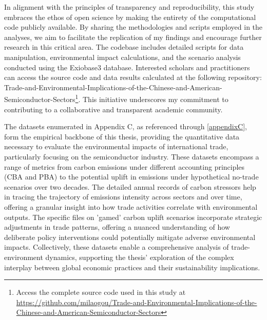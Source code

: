 In alignment with the principles of transparency and reproducibility, this study embraces the ethos of open science by making the entirety of the computational code publicly available. By sharing the methodologies and scripts employed in the analyses, we aim to facilitate the replication of my findings and encourage further research in this critical area. The codebase includes detailed scripts for data manipulation, environmental impact calculations, and the scenario analysis conducted using the Exiobase3 database. Interested scholars and practitioners can access the source code and data results calculated at the following repository: Trade-and-Environmental-Implications-of-the-Chinese-and-American-Semiconductor-Sectors\footnote{Access the complete source code used in this study at \url{https://github.com/milaogou/Trade-and-Environmental-Implications-of-the-Chinese-and-American-Semiconductor-Sectors}}. This initiative underscores my commitment to contributing to a collaborative and transparent academic community.

The datasets enumerated in Appendix C, as referenced through \ref{appendixC}, form the empirical backbone of this thesis, providing the quantitative data necessary to evaluate the environmental impacts of international trade, particularly focusing on the semiconductor industry. These datasets encompass a range of metrics from carbon emissions under different accounting principles (CBA and PBA) to the potential uplift in emissions under hypothetical no-trade scenarios over two decades. The detailed annual records of carbon stressors help in tracing the trajectory of emissions intensity across sectors and over time, offering a granular insight into how trade activities correlate with environmental outputs. The specific files on 'gamed' carbon uplift scenarios incorporate strategic adjustments in trade patterns, offering a nuanced understanding of how deliberate policy interventions could potentially mitigate adverse environmental impacts. Collectively, these datasets enable a comprehensive analysis of trade-environment dynamics, supporting the thesis' exploration of the complex interplay between global economic practices and their sustainability implications.